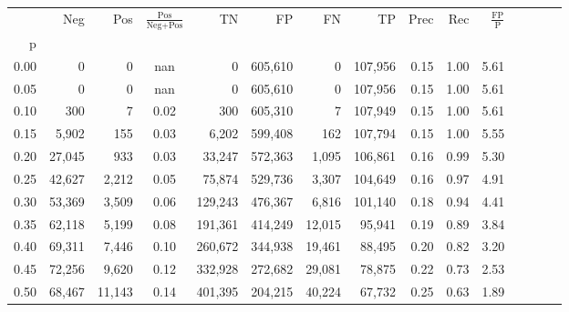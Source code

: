 \begin{tabular}{rrrcrrrrrrrrrrr}
\toprule
{} &     Neg &     Pos & $\frac{\text{Pos}}{\text{Neg}+\text{Pos}}$ &       TN &       FP &       FN &       TP &  Prec &   Rec & $\frac{\text{FP}}{\text{P}}$ \\
p    &         &         &                                            &          &          &          &          &       &       &                              \\
\midrule
0.00 &       0 &       0 &                                        nan &        0 &  605,610 &        0 &  107,956 &  0.15 &  1.00 &                         5.61 \\
0.05 &       0 &       0 &                                        nan &        0 &  605,610 &        0 &  107,956 &  0.15 &  1.00 &                         5.61 \\
0.10 &     300 &       7 &                                       0.02 &      300 &  605,310 &        7 &  107,949 &  0.15 &  1.00 &                         5.61 \\
0.15 &   5,902 &     155 &                                       0.03 &    6,202 &  599,408 &      162 &  107,794 &  0.15 &  1.00 &                         5.55 \\
0.20 &  27,045 &     933 &                                       0.03 &   33,247 &  572,363 &    1,095 &  106,861 &  0.16 &  0.99 &                         5.30 \\
0.25 &  42,627 &   2,212 &                                       0.05 &   75,874 &  529,736 &    3,307 &  104,649 &  0.16 &  0.97 &                         4.91 \\
0.30 &  53,369 &   3,509 &                                       0.06 &  129,243 &  476,367 &    6,816 &  101,140 &  0.18 &  0.94 &                         4.41 \\
0.35 &  62,118 &   5,199 &                                       0.08 &  191,361 &  414,249 &   12,015 &   95,941 &  0.19 &  0.89 &                         3.84 \\
0.40 &  69,311 &   7,446 &                                       0.10 &  260,672 &  344,938 &   19,461 &   88,495 &  0.20 &  0.82 &                         3.20 \\
0.45 &  72,256 &   9,620 &                                       0.12 &  332,928 &  272,682 &   29,081 &   78,875 &  0.22 &  0.73 &                         2.53 \\
0.50 &  68,467 &  11,143 &                                       0.14 &  401,395 &  204,215 &   40,224 &   67,732 &  0.25 &  0.63 &                         1.89 \\

\end{tabular}

